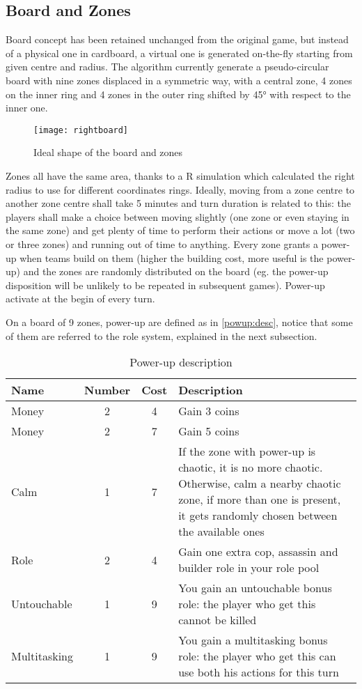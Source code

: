 		\subsection{Board and Zones}\label{design:board}
		
			Board concept has been retained unchanged from the original game, but instead of a physical one in cardboard, a virtual one is generated on-the-fly starting from given centre and radius.
			The algorithm currently generate a pseudo-circular board with nine zones displaced in a symmetric way, with a central zone, 4 zones on the inner ring and 4 zones in the outer ring shifted by 45° with respect to the inner one.
			
			\begin{figure}
				\centering
				\texttt{[image: rightboard]}
				\caption{Ideal shape of the board and zones}
			\end{figure}
			
			Zones all have the same area, thanks to a R simulation which calculated the right radius to use for different coordinates rings.
			Ideally, moving from a zone centre to another zone centre shall take 5 minutes and turn duration is related to this: the players shall make a choice between moving slightly (one zone or even staying in the same zone) and get plenty of time to perform their actions or move a lot (two or three zones) and running out of time to anything.
			Every zone grants a power-up when teams build on them (higher the building cost, more useful is the power-up) and the zones are randomly distributed on the board (eg. the power-up disposition will be unlikely to be repeated in subsequent games).
			Power-up activate at the begin of every turn.
			
			On a board of 9 zones, power-up are defined as in \autoref{powup:desc}, notice that some of them are referred to the role system, explained in the next subsection.
			
			\begin{table}
				\caption{Power-up description}
				\label{powup:desc}
				\centering
				\begin{tabular}{lccp{}}
					\toprule
					Name 			& Number 	& Cost 	& Description \\
					\midrule
					Money 			& 2 		& 4 	& Gain 3 coins \\
					Money 			& 2 		& 7 	& Gain 5 coins \\
					Calm 			& 1 		& 7 	& If the zone with power-up is chaotic, it is no more chaotic. Otherwise, calm a nearby chaotic zone, if more than one is present, it gets randomly chosen between the available ones \\
					Role 			& 2 		& 4 	& Gain one extra cop, assassin and builder role in your role pool \\
					Untouchable 	& 1 		& 9 	& You gain an untouchable bonus role: the player who get this cannot be killed \\
					Multitasking 	& 1 		& 9 	& You gain a multitasking bonus role: the player who get this can use both his actions for this turn \\
					\bottomrule
				\end{tabular}
			\end{table}
		
